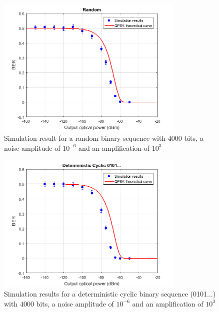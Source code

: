 	\begin{figure}[h]
		\centering
		\includegraphics[width=0.8\textwidth]{./figures/QPSK_BER_random}
		\caption{Simulation result for a random binary sequence with $4000$ bits, a noise amplitude of $10^{-6}$ and an amplification of $10^3$}
		\label{fig:ber_random}
	\end{figure}%
	\begin{figure}[h]
		\centering
		\includegraphics[width=0.8\textwidth]{./figures/QPSK_BER_deterministic_cyclic}
		\caption{Simulation results for a deterministic cyclic binary sequence (0101...) with $4000$ bits, a noise amplitude of $10^{-6}$ and an amplification of $10^3$}
		\label{fig:ber_det}
	\end{figure}




